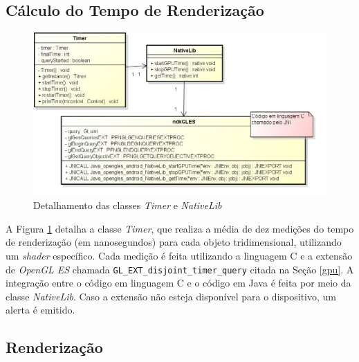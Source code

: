 \subsection{Cálculo do Tempo de Renderização}      

	\begin{figure}[ht]
	\centering
		\includegraphics[keepaspectratio=true,scale=0.6]{figuras/timer_nativelib.jpg}
	\caption{Detalhamento das classes \textit{Timer} e \textit{NativeLib}}
	\label{timer_nativelib}
	\end{figure}

	A Figura \ref{timer_nativelib} detalha a classe \textit{Timer}, que realiza a média de dez medições do tempo de renderização (em nanosegundos) para cada objeto tridimensional, utilizando um \textit{shader} específico. Cada medição é feita utilizando a linguagem C e a extensão de \textit{OpenGL ES} chamada \texttt{GL\_EXT\_disjoint\_timer\_query} citada na Seção \ref{gpu}.  A integração entre o código em linguagem C e o código em Java é feita por meio da classe \textit{NativeLib}. Caso a extensão não esteja disponível para o dispositivo, um alerta é emitido.

\subsection{Renderização}    

